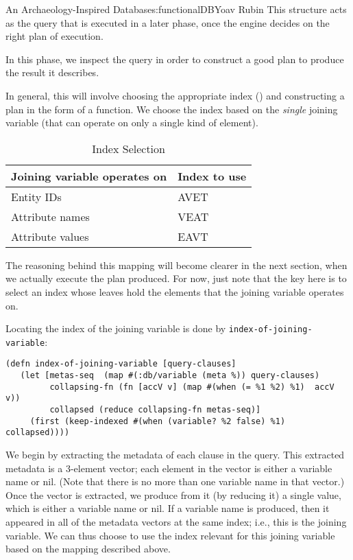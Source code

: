 \begin{aosachapter}{An Archaeology-Inspired Database}{s:functionalDB}{Yoav Rubin}
This structure acts as the query that is executed in a later phase, once
the engine decides on the right plan of execution.

\label{phase-2-making-a-plan}

In this phase, we inspect the query in order to construct a good plan to
produce the result it describes.

In general, this will involve choosing the appropriate index
() and constructing a plan
in the form of a function. We choose the index based on the
\emph{single} joining variable (that can operate on only a single kind
of element).

\begin{table}
\centering
{\footnotesize
{}
\begin{tabular}{ll}
\hline
\textbf{Joining variable operates on} & \textbf{Index to use} \\
\hline
Entity IDs & AVET \\
Attribute names & VEAT \\
Attribute values & EAVT \\
\hline
\end{tabular}
}
\caption{Index Selection}
\label{500l.functionaldb.indexselection}
\end{table}

The reasoning behind this mapping will become clearer in the next
section, when we actually execute the plan produced. For now, just note
that the key here is to select an index whose leaves hold the elements
that the joining variable operates on.

Locating the index of the joining variable is done by
\texttt{index-of-joining-variable}:

\begin{verbatim}
(defn index-of-joining-variable [query-clauses]
   (let [metas-seq  (map #(:db/variable (meta %)) query-clauses) 
         collapsing-fn (fn [accV v] (map #(when (= %1 %2) %1)  accV v))
         collapsed (reduce collapsing-fn metas-seq)] 
     (first (keep-indexed #(when (variable? %2 false) %1)  collapsed)))) 
\end{verbatim}

We begin by extracting the metadata of each clause in the query. This
extracted metadata is a 3-element vector; each element in the vector is
either a variable name or nil. (Note that there is no more than one
variable name in that vector.) Once the vector is extracted, we produce
from it (by reducing it) a single value, which is either a variable name
or nil. If a variable name is produced, then it appeared in all of the
metadata vectors at the same index; i.e., this is the joining variable.
We can thus choose to use the index relevant for this joining variable
based on the mapping described above.


\end{aosachapter}
